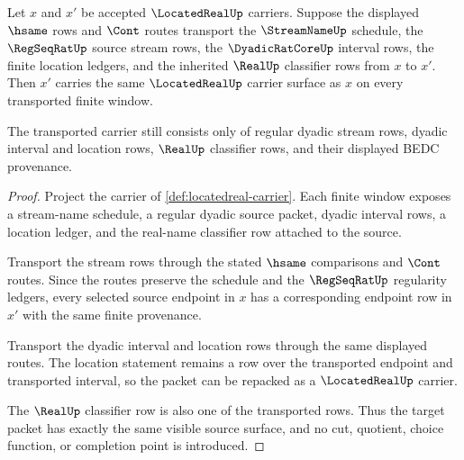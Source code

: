 \begin{theorem}
\label{thm:locatedreal-carrier-transport}
Let $x$ and $x'$ be accepted $\LocatedRealUp$ carriers. Suppose the displayed $\hsame$ rows and $\Cont$ routes transport the $\StreamNameUp$ schedule, the $\RegSeqRatUp$ source stream rows, the $\DyadicRatCoreUp$ interval rows, the finite location ledgers, and the inherited $\RealUp$ classifier rows from $x$ to $x'$. Then $x'$ carries the same $\LocatedRealUp$ carrier surface as $x$ on every transported finite window.

The transported carrier still consists only of regular dyadic stream rows, dyadic interval and location rows, $\RealUp$ classifier rows, and their displayed BEDC provenance.
\end{theorem}
\begin{proof}
Project the carrier of \autoref{def:locatedreal-carrier}. Each finite window exposes a stream-name schedule, a regular dyadic source packet, dyadic interval rows, a location ledger, and the real-name classifier row attached to the source.

Transport the stream rows through the stated $\hsame$ comparisons and $\Cont$ routes. Since the routes preserve the schedule and the $\RegSeqRatUp$ regularity ledgers, every selected source endpoint in $x$ has a corresponding endpoint row in $x'$ with the same finite provenance.

Transport the dyadic interval and location rows through the same displayed routes. The location statement remains a row over the transported endpoint and transported interval, so the packet can be repacked as a $\LocatedRealUp$ carrier.

The $\RealUp$ classifier row is also one of the transported rows. Thus the target packet has exactly the same visible source surface, and no cut, quotient, choice function, or completion point is introduced.
\end{proof}

